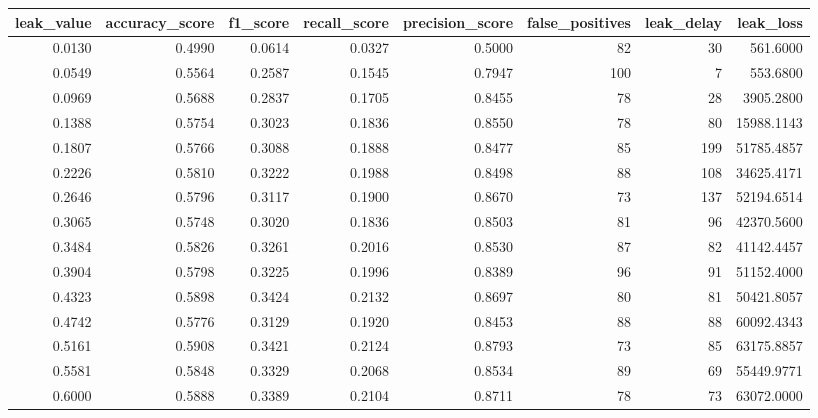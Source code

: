 \begin{tabular}{rrrrrrrr}
\toprule
leak\_value & accuracy\_score & f1\_score & recall\_score & precision\_score & false\_positives & leak\_delay & leak\_loss \\
\midrule
0.0130 & 0.4990 & 0.0614 & 0.0327 & 0.5000 & 82 & 30 & 561.6000 \\
0.0549 & 0.5564 & 0.2587 & 0.1545 & 0.7947 & 100 & 7 & 553.6800 \\
0.0969 & 0.5688 & 0.2837 & 0.1705 & 0.8455 & 78 & 28 & 3905.2800 \\
0.1388 & 0.5754 & 0.3023 & 0.1836 & 0.8550 & 78 & 80 & 15988.1143 \\
0.1807 & 0.5766 & 0.3088 & 0.1888 & 0.8477 & 85 & 199 & 51785.4857 \\
0.2226 & 0.5810 & 0.3222 & 0.1988 & 0.8498 & 88 & 108 & 34625.4171 \\
0.2646 & 0.5796 & 0.3117 & 0.1900 & 0.8670 & 73 & 137 & 52194.6514 \\
0.3065 & 0.5748 & 0.3020 & 0.1836 & 0.8503 & 81 & 96 & 42370.5600 \\
0.3484 & 0.5826 & 0.3261 & 0.2016 & 0.8530 & 87 & 82 & 41142.4457 \\
0.3904 & 0.5798 & 0.3225 & 0.1996 & 0.8389 & 96 & 91 & 51152.4000 \\
0.4323 & 0.5898 & 0.3424 & 0.2132 & 0.8697 & 80 & 81 & 50421.8057 \\
0.4742 & 0.5776 & 0.3129 & 0.1920 & 0.8453 & 88 & 88 & 60092.4343 \\
0.5161 & 0.5908 & 0.3421 & 0.2124 & 0.8793 & 73 & 85 & 63175.8857 \\
0.5581 & 0.5848 & 0.3329 & 0.2068 & 0.8534 & 89 & 69 & 55449.9771 \\
0.6000 & 0.5888 & 0.3389 & 0.2104 & 0.8711 & 78 & 73 & 63072.0000 \\
\bottomrule
\end{tabular}
